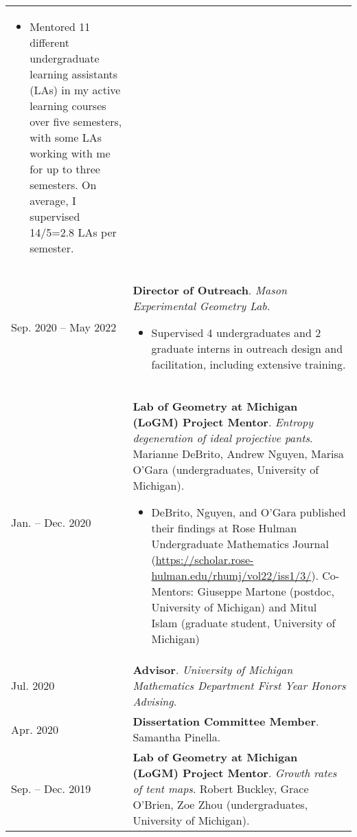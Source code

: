 \begin{center}
{\begin{longtable}{p{}  p{}}
        {\small
        \begin{itemize}
        \setlength{\parindent}{0em}
        \item[] Mentored 11 different undergraduate learning assistants (LAs) in my active learning courses over five semesters, with some LAs working with me for up to three semesters. On average, I supervised 14/5=2.8 LAs per semester.
        \end{itemize}
        }
        \vspace{-1em}
         \\ 
 Sep.  2020 --  May  2022 & \textbf{Director of Outreach}. \textit{Mason Experimental Geometry Lab}. 
        \hspace{-1em}

        {\small
        \begin{itemize}
        \setlength{\parindent}{0em}
        \item[] Supervised 4 undergraduates and 2 graduate interns in outreach design and facilitation, including extensive training.
        \end{itemize}
        }
        \vspace{-1em}
         \\ 
 Jan.  --  Dec.  2020 & \textbf{Lab of Geometry at Michigan (LoGM) Project Mentor}. \textit{Entropy degeneration of ideal projective pants}.  Marianne DeBrito, Andrew Nguyen, Marisa O'Gara (undergraduates, University of Michigan). 
        \hspace{-1em}

        {\small
        \begin{itemize}
        \setlength{\parindent}{0em}
        \item[] DeBrito, Nguyen, and O'Gara published their findings at Rose Hulman Undergraduate Mathematics Journal (\url{https://scholar.rose-hulman.edu/rhumj/vol22/iss1/3/}).
            Co-Mentors: Giuseppe Martone (postdoc, University of Michigan) and Mitul Islam (graduate student, University of Michigan) 
        \end{itemize}
        }
        \vspace{-1em}
         \\ 
 Jul.  2020 & \textbf{Advisor}. \textit{University of Michigan Mathematics Department First Year Honors Advising}.  \\ 
 Apr.  2020 & \textbf{Dissertation Committee Member}.  Samantha Pinella.  \\ 
 Sep.  --  Dec.  2019 & \textbf{Lab of Geometry at Michigan (LoGM) Project Mentor}. \textit{Growth rates of tent maps}.  Robert Buckley, Grace O'Brien, Zoe Zhou (undergraduates, University of Michigan). 
        \hspace{-1em}


\end{longtable}}
\end{center}
